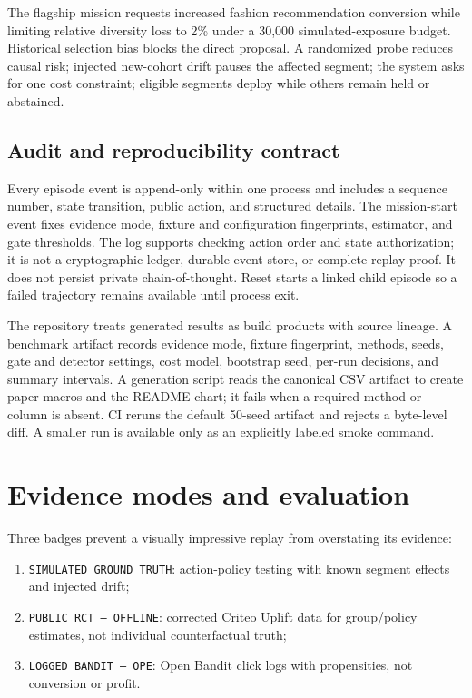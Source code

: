 \documentclass[11pt,twocolumn]{article}
\begin{document}
The flagship mission requests increased fashion recommendation conversion while limiting relative diversity loss to 2\% under a 30,000 simulated-exposure budget. Historical selection bias blocks the direct proposal. A randomized probe reduces causal risk; injected new-cohort drift pauses the affected segment; the system asks for one cost constraint; eligible segments deploy while others remain held or abstained.

\subsection{Audit and reproducibility contract}

Every episode event is append-only within one process and includes a sequence number, state transition, public action, and structured details. The mission-start event fixes evidence mode, fixture and configuration fingerprints, estimator, and gate thresholds. The log supports checking action order and state authorization; it is not a cryptographic ledger, durable event store, or complete replay proof. It does not persist private chain-of-thought. Reset starts a linked child episode so a failed trajectory remains available until process exit.

The repository treats generated results as build products with source lineage. A benchmark artifact records evidence mode, fixture fingerprint, methods, seeds, gate and detector settings, cost model, bootstrap seed, per-run decisions, and summary intervals. A generation script reads the canonical CSV artifact to create paper macros and the README chart; it fails when a required method or column is absent. CI reruns the default 50-seed artifact and rejects a byte-level diff. A smaller run is available only as an explicitly labeled smoke command.

\section{Evidence modes and evaluation}

Three badges prevent a visually impressive replay from overstating its evidence:

\begin{enumerate}
  \item \texttt{SIMULATED GROUND TRUTH}: action-policy testing with known segment effects and injected drift;
  \item \texttt{PUBLIC RCT --- OFFLINE}: corrected Criteo Uplift data for group/policy estimates, not individual counterfactual truth;
  \item \texttt{LOGGED BANDIT --- OPE}: Open Bandit click logs with propensities, not conversion or profit.
\end{enumerate}
\end{document}

